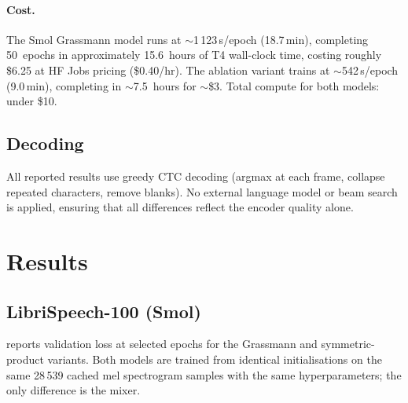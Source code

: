 \documentclass[11pt,a4paper]{article}
\begin{document}
\paragraph{Cost.}  The Smol Grassmann model runs at $\sim$1\,123\,s/epoch
(18.7\,min), completing 50~epochs in approximately 15.6~hours of T4
wall-clock time, costing roughly \$6.25 at HF Jobs pricing (\$0.40/hr).
The ablation variant trains at $\sim$542\,s/epoch (9.0\,min), completing
in $\sim$7.5~hours for $\sim$\$3.  Total compute for both models:
under \$10.

\subsection{Decoding}

All reported results use greedy CTC decoding (argmax at each frame,
collapse repeated characters, remove blanks).  No external language
model or beam search is applied, ensuring that all differences
reflect the encoder quality alone.

\section{Results}
\label{sec:results}

\subsection{LibriSpeech-100 (Smol)}

 reports validation loss at selected epochs for
the Grassmann and symmetric-product variants.  Both models are trained
from identical initialisations on the same 28\,539 cached mel
spectrogram samples with the same hyperparameters; the only difference
is the mixer.
\end{document}
